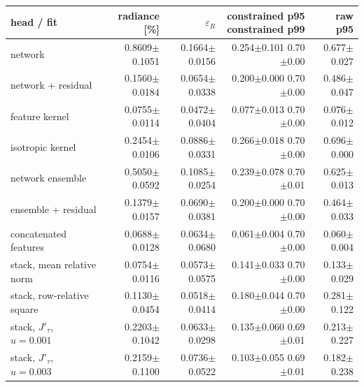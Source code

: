 {\fontsize{9}{11}\selectfont
\setlength{\tabcolsep}{2.7pt}
\begin{tabular}{lrrrr}
\toprule
head / fit & radiance [\%] & $\varepsilon_R$ & \thead{constrained p95\\constrained p99} & raw p95 \\
\midrule
network & 0.8609$\pm$0.1051 & 0.1664$\pm$0.0156 & \shortstack{0.254$\pm$0.101\\0.70$\pm$0.00} & 0.677$\pm$0.027 \\
network + residual & 0.1560$\pm$0.0184 & 0.0654$\pm$0.0338 & \shortstack{0.200$\pm$0.000\\0.70$\pm$0.00} & 0.486$\pm$0.047 \\
feature kernel & 0.0755$\pm$0.0114 & 0.0472$\pm$0.0404 & \shortstack{0.077$\pm$0.013\\0.70$\pm$0.00} & 0.076$\pm$0.012 \\
isotropic kernel & 0.2454$\pm$0.0106 & 0.0886$\pm$0.0331 & \shortstack{0.266$\pm$0.018\\0.70$\pm$0.00} & 0.696$\pm$0.000 \\
network ensemble & 0.5050$\pm$0.0592 & 0.1085$\pm$0.0254 & \shortstack{0.239$\pm$0.078\\0.70$\pm$0.01} & 0.625$\pm$0.013 \\
ensemble + residual & 0.1379$\pm$0.0157 & 0.0690$\pm$0.0381 & \shortstack{0.200$\pm$0.000\\0.70$\pm$0.00} & 0.464$\pm$0.033 \\
concatenated features & 0.0688$\pm$0.0128 & 0.0634$\pm$0.0680 & \shortstack{0.061$\pm$0.004\\0.70$\pm$0.00} & 0.060$\pm$0.004 \\
stack, mean relative norm & 0.0754$\pm$0.0116 & 0.0573$\pm$0.0575 & \shortstack{0.141$\pm$0.033\\0.70$\pm$0.00} & 0.133$\pm$0.029 \\
stack, row-relative square & 0.1130$\pm$0.0454 & 0.0518$\pm$0.0414 & \shortstack{0.180$\pm$0.044\\0.70$\pm$0.00} & 0.281$\pm$0.122 \\
stack, $J'_\tau$, $u=0.001$ & 0.2203$\pm$0.1042 & 0.0633$\pm$0.0298 & \shortstack{0.135$\pm$0.060\\0.69$\pm$0.01} & 0.213$\pm$0.227 \\
stack, $J'_\tau$, $u=0.003$ & 0.2159$\pm$0.1100 & 0.0736$\pm$0.0522 & \shortstack{0.103$\pm$0.055\\0.69$\pm$0.01} & 0.182$\pm$0.238 \\

\end{tabular}}
